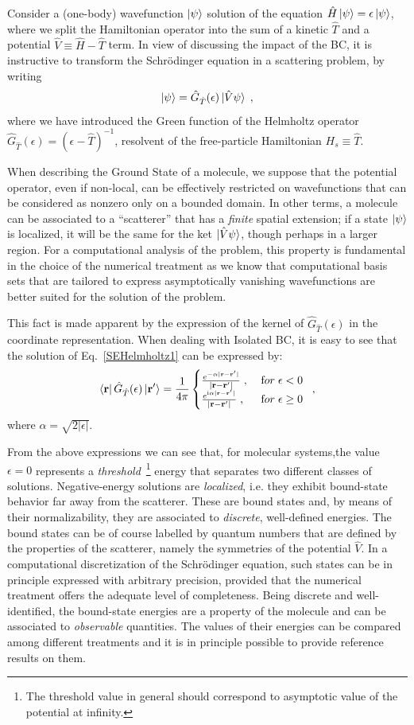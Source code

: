 \documentclass[reprint,aps,prb]{revtex4-1}
\renewcommand{\r}{{\bf r}}
\newcommand{\eps}{\epsilon}
\newcommand{\ii}{\mathrm{i}}
\newcommand{\be}{\begin{equation}}
\newcommand{\ee}{\end{equation}}
\newcommand{\lb}{\label}
\newcommand{\op}[1]{\hat {#1}}
\newcommand{\GH}{\op G_{\op T}}
\begin{document}
Consider a (one-body) wavefunction $\ket{\psi}$ solution of the equation
$\op H\ket{\psi}=\eps\ket{\psi}$, where we split the Hamiltonian operator into the sum of
a kinetic $\op T$ and a potential $\op V \equiv \op H - \op T$ term.
In view of discussing the impact of the BC, it is instructive to transform
the Schr\"odinger equation in a scattering problem, by writing
\be\lb{SEHelmholtz1}
\ket{\psi} = \GH(\eps)\ket{\op V\psi}\;,
\ee
where we have introduced the Green function of the Helmholtz operator $\GH(\eps) = (\eps-\op T)^{-1}$,
resolvent of the free-particle Hamiltonian $H_s \equiv \op T$.

When describing the Ground State of a molecule, we suppose that the potential operator, even if non-local,
can be effectively restricted on wavefunctions that can be considered as nonzero only on a
bounded domain. In other terms, a molecule can be associated to a ``scatterer'' that has a \emph{finite}
spatial extension; if a state $\ket{\psi}$ is localized, it will be the same for the ket $\ket{\op V \psi}$, though
perhaps in a larger region.
For a computational analysis of the problem, this property is fundamental in the choice of the numerical treatment as we know that
computational basis sets
that are tailored to express asymptotically vanishing wavefunctions are better suited for the solution of the problem.

This fact is made apparent by the expression of
the kernel of $\GH(\eps)$ in the coordinate representation.
When dealing with Isolated BC, it is easy to see that the solution of Eq.~\eqref{SEHelmholtz1}
can be expressed by:
\be\lb{HelmholtzKernelDef1}
\bra{\r} \GH(\eps) \ket{\r'} = \frac{1}{4\pi} \begin{cases}
\frac{e^{-\alpha|\r - \r' |}}{|\r- \r' |} \;,\; & {\textrm for}\; \eps  < 0\; \\
\frac{e^{\ii \alpha |\r-\r' |}}{|\r-\r' |} \;, & {\textrm for} \; \eps \geq 0
\end{cases} \;,
\ee
where $\alpha = \sqrt{2|\eps|}$.

From the above expressions we can see that, for molecular systems,the value $\epsilon=0$
represents a \emph{threshold}~\footnote{The threshold value in general should correspond to asymptotic value of the potential at infinity.}
energy that separates two different classes of solutions.
Negative-energy solutions are \emph{localized}, i.e. they exhibit bound-state behavior far away from the scatterer.
These are bound states and, by means of their normalizability, they are associated to \emph{discrete}, well-defined energies.
The bound states can be of course labelled by quantum numbers that are defined by the properties of the scatterer, namely the
symmetries of the potential $\op V$.
In a computational discretization of the Schr\"odinger equation, such states can be in principle expressed with arbitrary precision,
provided that the numerical treatment offers the adequate level of completeness.
Being discrete and well-identified, the bound-state energies are a property of the molecule and can be associated to \emph{observable}
quantities. The values of their energies can be compared among different treatments and it is in principle possible to
provide reference results on them.
\end{document}
